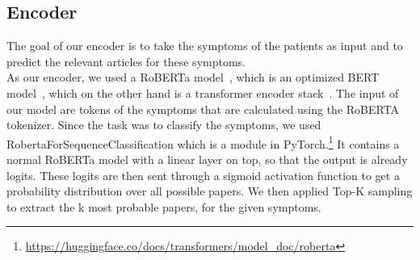 \subsection{Encoder}
The goal of our encoder is to take the symptoms of the patients as input and to predict the relevant articles for these symptoms.\\
As our encoder, we used a RoBERTa model~\cite{liu2019robertarobustlyoptimizedbert}, which is an optimized BERT model~\cite{devlin2018bert}, which on the other hand is a transformer encoder stack~\cite{vaswani2017attention}. The input of our model are tokens of the symptoms that are calculated using the RoBERTA tokenizer. Since the task was to classify the symptoms, we used RobertaForSequenceClassification which is a module in PyTorch.\footnote{\url{https://huggingface.co/docs/transformers/model_doc/roberta}} It contains a normal RoBERTa model with a linear layer on top, so that the output is already logits. These logits are then sent through a sigmoid activation function to get a probability distribution over all possible papers. We then applied Top-K sampling to extract the k most probable papers, for the given symptoms.

